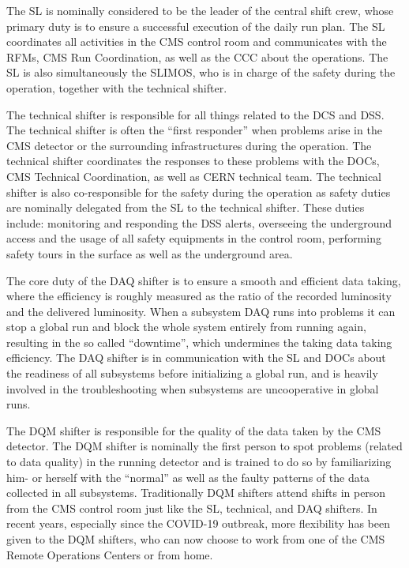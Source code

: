 The \ac{SL} is nominally considered to be the leader of the central shift crew, whose primary duty is to ensure a successful execution of the daily run plan. The \ac{SL} coordinates all activities in the \ac{CMS} control room and communicates with the \acp{RFM}, \ac{CMS} Run Coordination, as well as the \ac{CCC} about the operations. The \ac{SL} is also simultaneously the \ac{SLIMOS}, who is in charge of the safety during the operation, together with the technical shifter. 

The technical shifter is responsible for all things related to the \ac{DCS} and \ac{DSS}. The technical shifter is often the ``first responder'' when problems arise in the \ac{CMS} detector or the surrounding infrastructures during the operation. The technical shifter coordinates the responses to these problems with the \acp{DOC}, \ac{CMS} Technical Coordination, as well as \ac{CERN} technical team. The technical shifter is also co-responsible for the safety during the operation as safety duties are nominally delegated from the \ac{SL} to the technical shifter. These duties include: monitoring and responding the \ac{DSS} alerts, overseeing the underground access and the usage of all safety equipments in the control room, performing safety tours in the surface as well as the underground area. 

The core duty of the \ac{DAQ} shifter is to ensure a smooth and efficient data taking, where the efficiency is roughly measured as the ratio of the recorded luminosity and the delivered luminosity. When a subsystem \ac{DAQ}  runs into problems it can stop a global run and block the whole system entirely from running again, resulting in the so called ``downtime'', which undermines the taking data taking efficiency. The \ac{DAQ} shifter is in communication with the \ac{SL} and \acp{DOC} about the readiness of all subsystems before initializing a global run, and is heavily involved in the troubleshooting when subsystems are uncooperative in global runs.

The \ac{DQM} shifter is responsible for the quality of the data taken by the \ac{CMS} detector. The \ac{DQM} shifter is nominally the first person to spot problems (related to data quality) in the running detector and is trained to do so by familiarizing him- or herself with the ``normal'' as well as the faulty patterns of the data collected in all subsystems. Traditionally \ac{DQM} shifters attend shifts in person from the \ac{CMS} control room just like the \ac{SL}, technical, and \ac{DAQ} shifters. In recent years, especially since the COVID-19 outbreak, more flexibility has been given to the \ac{DQM} shifters, who can now choose to work from one of the \ac{CMS} Remote Operations Centers or from home.

